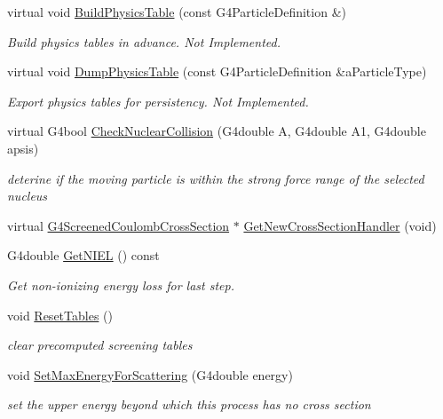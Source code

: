 \begin{DoxyCompactItemize}
virtual void \hyperlink{classG4ScreenedNuclearRecoil_a8862a7af081d952a63839157d7c653d2}{Build\+Physics\+Table} (const G4\+Particle\+Definition \&)
\begin{DoxyCompactList}\small\item\em Build physics tables in advance. Not Implemented. \end{DoxyCompactList}\item 
virtual void \hyperlink{classG4ScreenedNuclearRecoil_a29563bde39caea67caadd4e60d9f736d}{Dump\+Physics\+Table} (const G4\+Particle\+Definition \&a\+Particle\+Type)
\begin{DoxyCompactList}\small\item\em Export physics tables for persistency. Not Implemented. \end{DoxyCompactList}\item 
virtual G4bool \hyperlink{classG4ScreenedNuclearRecoil_aa22d29f8744e5c8f55935f6d1bd88478}{Check\+Nuclear\+Collision} (G4double A, G4double A1, G4double apsis)
\begin{DoxyCompactList}\small\item\em deterine if the moving particle is within the strong force range of the selected nucleus \end{DoxyCompactList}\item 
virtual \hyperlink{classG4ScreenedCoulombCrossSection}{G4\+Screened\+Coulomb\+Cross\+Section} $\ast$ \hyperlink{classG4ScreenedNuclearRecoil_a97e43210067375ffcdc61742b57e4d47}{Get\+New\+Cross\+Section\+Handler} (void)
\item 
G4double \hyperlink{classG4ScreenedNuclearRecoil_ae05a88f90d98f618a236e7a5c9b3a460}{Get\+N\+I\+EL} () const 
\begin{DoxyCompactList}\small\item\em Get non-\/ionizing energy loss for last step. \end{DoxyCompactList}\item 
void \hyperlink{classG4ScreenedNuclearRecoil_a18b5ff579de48e81e6fc001240aebdad}{Reset\+Tables} ()
\begin{DoxyCompactList}\small\item\em clear precomputed screening tables \end{DoxyCompactList}\item 
void \hyperlink{classG4ScreenedNuclearRecoil_aff68cd261bf6f47ca064e226710faa33}{Set\+Max\+Energy\+For\+Scattering} (G4double energy)
\begin{DoxyCompactList}\small\item\em set the upper energy beyond which this process has no cross section \end{DoxyCompactList}\item 

\end{DoxyCompactItemize}
